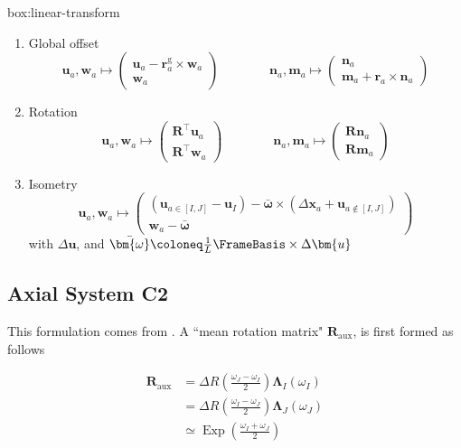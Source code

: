 \begin{ambox}{box:linear-transform}
\begin{enumerate}
    \item Global offset
    \[
    \bm{u}_a,\bm{w}_a \mapsto \begin{pmatrix}
        \bm{u}_a - \bm{r}_a^{\mathrm{g}}\times \bm{w}_a \\
        \bm{w}_a
    \end{pmatrix}
    \qquad\qquad
    \bm{n}_a,\bm{m}_a \mapsto \begin{pmatrix}
        \bm{n}_a \\
        \bm{m}_a + \bm{r}_a \times\bm{n}_a
    \end{pmatrix}
    \]
    \item Rotation
    \[
    \bm{u}_a,\bm{w}_a \mapsto \begin{pmatrix}
        \bm{R}^{\top}\bm{u}_a \\
        \bm{R}^{\top}\bm{w}_a
    \end{pmatrix}
    \qquad\qquad
    \bm{n}_a,\bm{m}_a \mapsto \begin{pmatrix}
        \bm{R}\bm{n}_a \\
        \bm{R}\bm{m}_a
    \end{pmatrix}
    \]
    \item Isometry
    \[
    \bm{u}_a,\bm{w}_a \mapsto \begin{pmatrix}
        (\bm{u}_{a \in [I,J]} - \bm{u}_I) 
        - \bar{\bm{\omega}}\times (\Delta\bm{x}_a + \bm{u}_{a \notin [I,J]}) \\
        \bm{w}_a - \bar{\bm{\omega}}
    \end{pmatrix}
    \]
    with \(\Delta\bm{u}\), and \(\bar{\bm{\omega}} \coloneq \frac{1}{L} \FrameBasis \times \Delta \bm{u}\)
\end{enumerate}
\end{ambox}



\subsection{Axial System C2}
This formulation comes from \cite{crisfield1990consistent}. 
A ``mean rotation matrix" $\bm{R}_{\mathrm{aux}}$, is first formed as follows

$$
\begin{aligned}
\bm{R}_{\mathrm{aux}}
&=\Delta R\left(\frac{\omega_J-\omega_I}{2}\right) \bm{\Lambda}_I(\omega_I) \\
&=\Delta R\left(\frac{\omega_I-\omega_J}{2}\right) \bm{\Lambda}_J(\omega_J) \\
& \simeq \operatorname{Exp}\left(\frac{\omega_I+\omega_J}{2}\right)
\end{aligned}
$$

